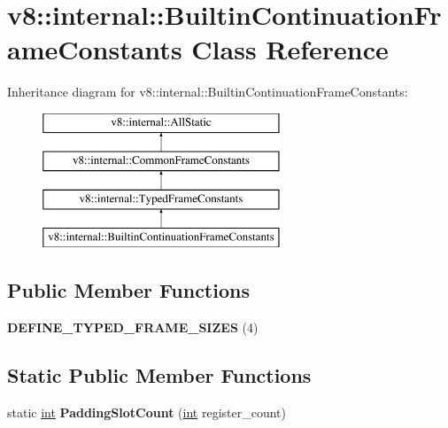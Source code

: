\hypertarget{classv8_1_1internal_1_1BuiltinContinuationFrameConstants}{}\section{v8\+:\+:internal\+:\+:Builtin\+Continuation\+Frame\+Constants Class Reference}
\label{classv8_1_1internal_1_1BuiltinContinuationFrameConstants}
Inheritance diagram for v8\+:\+:internal\+:\+:Builtin\+Continuation\+Frame\+Constants\+:\begin{figure}[H]
\begin{center}
\leavevmode
\includegraphics[height=4.000000cm]{classv8_1_1internal_1_1BuiltinContinuationFrameConstants}
\end{center}
\end{figure}
\subsection*{Public Member Functions}
\begin{DoxyCompactItemize}
\item 
\mbox{\label{classv8_1_1internal_1_1BuiltinContinuationFrameConstants_ad42ec845a02124b8af4b0d2bf7998a47}} 
{\bfseries D\+E\+F\+I\+N\+E\+\_\+\+T\+Y\+P\+E\+D\+\_\+\+F\+R\+A\+M\+E\+\_\+\+S\+I\+Z\+ES} (4)
\end{DoxyCompactItemize}
\subsection*{Static Public Member Functions}
\begin{DoxyCompactItemize}
\item 
\mbox{\label{classv8_1_1internal_1_1BuiltinContinuationFrameConstants_ad7a443751655910d7f5cbb327321dd3c}} 
static \mbox{\hyperlink{classint}{int}} {\bfseries Padding\+Slot\+Count} (\mbox{\hyperlink{classint}{int}} register\+\_\+count)
\end{DoxyCompactItemize}
